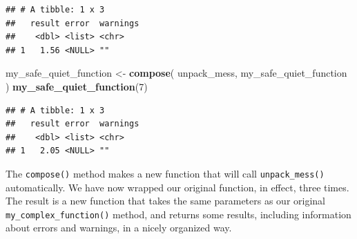 \documentclass[
]{book}
\newenvironment{Shaded}{\begin{snugshade}}{\end{snugshade}}
\newcommand{\AttributeTok}[1]{\textcolor[rgb]{0.13,0.29,0.53}{#1}}
\newcommand{\ConstantTok}[1]{\textcolor[rgb]{0.56,0.35,0.01}{#1}}
\newcommand{\ControlFlowTok}[1]{\textcolor[rgb]{0.13,0.29,0.53}{\textbf{#1}}}
\newcommand{\DecValTok}[1]{\textcolor[rgb]{0.00,0.00,0.81}{#1}}
\newcommand{\FunctionTok}[1]{\textcolor[rgb]{0.13,0.29,0.53}{\textbf{#1}}}
\newcommand{\NormalTok}[1]{#1}
\newcommand{\OtherTok}[1]{\textcolor[rgb]{0.56,0.35,0.01}{#1}}
\newcommand{\SpecialCharTok}[1]{\textcolor[rgb]{0.81,0.36,0.00}{\textbf{#1}}}
\newcommand{\StringTok}[1]{\textcolor[rgb]{0.31,0.60,0.02}{#1}}
\begin{document}
\begin{Shaded}
\end{Shaded}

\begin{verbatim}
## # A tibble: 1 x 3
##   result error  warnings
##    <dbl> <list> <chr>   
## 1   1.56 <NULL> ""
\end{verbatim}

\begin{Shaded}
\begin{Highlighting}[]
\NormalTok{my\_safe\_quiet\_function }\OtherTok{\textless{}{-}} \FunctionTok{compose}\NormalTok{( unpack\_mess, my\_safe\_quiet\_function )}
\FunctionTok{my\_safe\_quiet\_function}\NormalTok{(}\DecValTok{7}\NormalTok{)}
\end{Highlighting}
\end{Shaded}

\begin{verbatim}
## # A tibble: 1 x 3
##   result error  warnings
##    <dbl> <list> <chr>   
## 1   2.05 <NULL> ""
\end{verbatim}

The \texttt{compose()} method makes a new function that will call \texttt{unpack\_mess()} automatically.
We have now wrapped our original function, in effect, three times.
The result is a new function that takes the same parameters as our original \texttt{my\_complex\_function()} method, and returns some results, including information about errors and warnings, in a nicely organized way.
\end{document}
